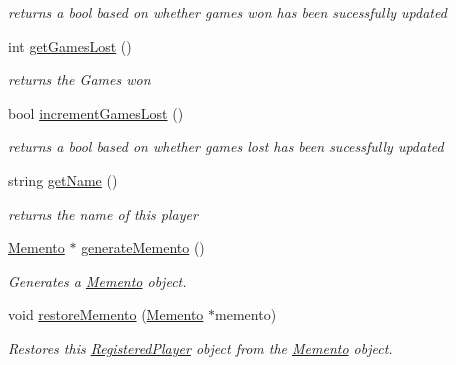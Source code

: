 \begin{DoxyCompactItemize}
\begin{DoxyCompactList}\small\item\em returns a bool based on whether games won has been sucessfully updated \item\end{DoxyCompactList}\item 
\hypertarget{classRegisteredPlayer_ad36ab2a8410ab7c1737f4e6a42dd700e}{
int \hyperlink{classRegisteredPlayer_ad36ab2a8410ab7c1737f4e6a42dd700e}{getGamesLost} ()}
\label{classRegisteredPlayer_ad36ab2a8410ab7c1737f4e6a42dd700e}

\begin{DoxyCompactList}\small\item\em returns the Games won \item\end{DoxyCompactList}\item 
\hypertarget{classRegisteredPlayer_a2ee5bcbc942517c3d22475f96c9937c9}{
bool \hyperlink{classRegisteredPlayer_a2ee5bcbc942517c3d22475f96c9937c9}{incrementGamesLost} ()}
\label{classRegisteredPlayer_a2ee5bcbc942517c3d22475f96c9937c9}

\begin{DoxyCompactList}\small\item\em returns a bool based on whether games lost has been sucessfully updated \item\end{DoxyCompactList}\item 
\hypertarget{classRegisteredPlayer_ababd7f33044952a9e16697ec13f74c40}{
string \hyperlink{classRegisteredPlayer_ababd7f33044952a9e16697ec13f74c40}{getName} ()}
\label{classRegisteredPlayer_ababd7f33044952a9e16697ec13f74c40}

\begin{DoxyCompactList}\small\item\em returns the name of this player \item\end{DoxyCompactList}\item 
\hyperlink{classMemento}{Memento} $\ast$ \hyperlink{classRegisteredPlayer_ab9436dac85b13fe2ad6849eb4efb02b8}{generateMemento} ()
\begin{DoxyCompactList}\small\item\em Generates a \hyperlink{classMemento}{Memento} object. \item\end{DoxyCompactList}\item 
void \hyperlink{classRegisteredPlayer_a2a588dca8f68c5d72b4f73312f017c4d}{restoreMemento} (\hyperlink{classMemento}{Memento} $\ast$memento)
\begin{DoxyCompactList}\small\item\em Restores this \hyperlink{classRegisteredPlayer}{RegisteredPlayer} object from the \hyperlink{classMemento}{Memento} object. \item\end{DoxyCompactList}\end{DoxyCompactItemize}


